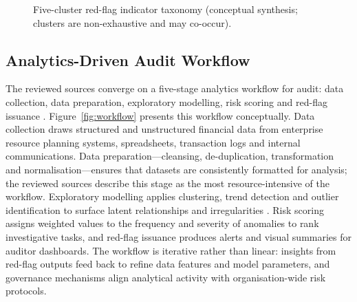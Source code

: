 \documentclass[conference]{IEEEtran}
\begin{document}
\begin{figure}[!t]
\centering
{}
\caption{Five-cluster red-flag indicator taxonomy (conceptual synthesis; clusters are non-exhaustive and may co-occur).}
\label{fig:taxonomy}
\end{figure}

\subsection{Analytics-Driven Audit Workflow}
\label{sec:workflow}

The reviewed sources converge on a five-stage analytics workflow for audit: data collection, data preparation, exploratory modelling, risk scoring and red-flag issuance \cite{b58}. Figure~\ref{fig:workflow} presents this workflow conceptually. Data collection draws structured and unstructured financial data from enterprise resource planning systems, spreadsheets, transaction logs and internal communications. Data preparation---cleansing, de-duplication, transformation and normalisation---ensures that datasets are consistently formatted for analysis; the reviewed sources describe this stage as the most resource-intensive of the workflow. Exploratory modelling applies clustering, trend detection and outlier identification to surface latent relationships and irregularities \cite{b59}. Risk scoring assigns weighted values to the frequency and severity of anomalies to rank investigative tasks, and red-flag issuance produces alerts and visual summaries for auditor dashboards. The workflow is iterative rather than linear: insights from red-flag outputs feed back to refine data features and model parameters, and governance mechanisms align analytical activity with organisation-wide risk protocols.
\end{document}
